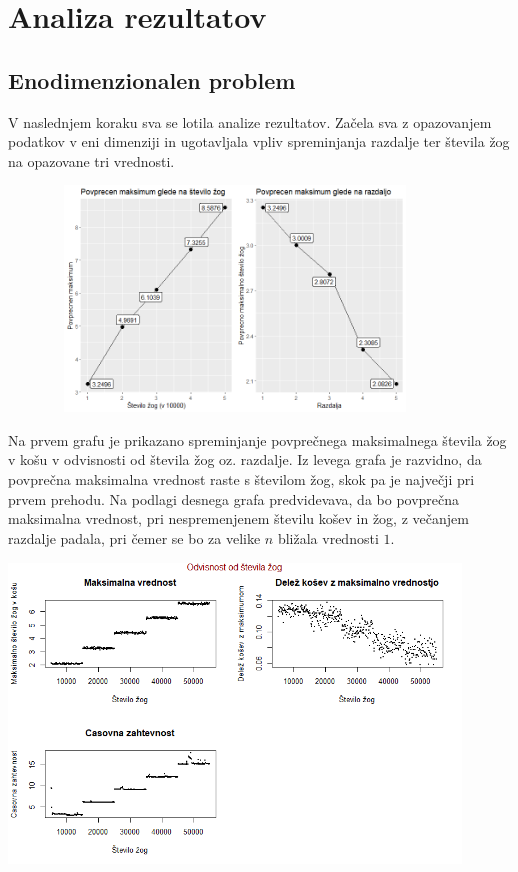 \documentclass[a4paper, 11pt]{article}
\begin{document}
\section{Analiza rezultatov}
\subsection{Enodimenzionalen problem}
V naslednjem koraku sva se lotila analize rezultatov. Začela sva z opazovanjem podatkov v eni dimenziji in ugotavljala vpliv spreminjanja razdalje ter števila žog na opazovane tri vrednosti.
\bigbreak

\includegraphics[width=12cm, height=6cm]{povprecje_1dim1.png}

Na prvem grafu je prikazano spreminjanje povprečnega maksimalnega števila žog v košu v odvisnosti od števila žog oz. razdalje.
Iz levega grafa je razvidno, da povprečna maksimalna vrednost raste s številom žog, skok pa je največji pri prvem prehodu.
Na podlagi desnega grafa predvidevava, da bo povprečna maksimalna vrednost, pri nespremenjenem številu košev in žog, z večanjem razdalje padala, pri čemer se bo za velike $n$ bližala vrednosti $1$.
\bigbreak


\includegraphics[width=12cm, height=8cm]{dim1_glede_na_stevilo_zog1.png}
\end{document}

